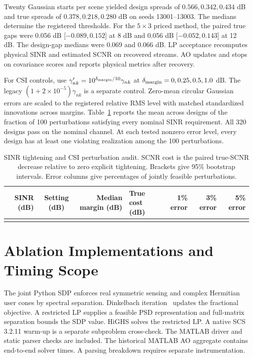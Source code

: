 \documentclass[journal]{IEEEtran}
\makeatletter
\newcommand{\TabRows}[1]{\@@input{#1}}
\providecommand{\LetterAssets}{../../results/partf-2026-11-23/assets}
\makeatother
\begin{document}
Twenty Gaussian starts per scene yielded design spreads of \(0.566,0.342,0.434\) dB and true spreads of \(0.378,0.218,0.280\) dB on seeds 13001--13003. The medians determine the registered thresholds. For the \(5\times3\) priced method, the paired true gaps were 0.056 dB [\(-0.089,0.152\)] at 8 dB and 0.056 dB [\(-0.052,0.143\)] at 12 dB. The design-gap medians were 0.069 and 0.066 dB. LP acceptance recomputes physical SINR and estimated SCNR on recovered streams. AO updates and stops on covariance scores and reports physical metrics after recovery.

For CSI controls, use \(\gamma'_{nk}=10^{\delta_{\rm margin}/10}\gamma_{nk}\) at \(\delta_{\rm margin}=0,0.25,0.5,1.0\) dB. The legacy \((1+2\times10^{-5})\gamma_{nk}\) is a separate control. Zero-mean circular Gaussian errors are scaled to the registered relative RMS level with matched standardized innovations across margins. Table~\ref{tab:csi} reports the mean across designs of the fraction of 100 perturbations satisfying every nominal SINR requirement. All 320 designs pass on the nominal channel. At each tested nonzero error level, every design has at least one violating realization among the 100 perturbations.

\begin{table}[t]
\caption{SINR tightening and CSI perturbation audit. SCNR cost is the paired true-SCNR decrease relative to zero explicit tightening. Brackets give 95\% bootstrap intervals. Error columns give percentages of jointly feasible perturbations.}
\label{tab:csi}
\centering\footnotesize
\begin{tabular}{@{}rcrlrrr@{}}
\toprule
SINR (dB) & Setting (dB) & Median margin (dB) & True cost (dB) & 1\% error & 3\% error & 5\% error\\
\midrule
\TabRows{\LetterAssets/csi.tex}
\bottomrule
\end{tabular}
\end{table}

\section{Ablation Implementations and Timing Scope}
The joint Python SDP enforces real symmetric sensing and complex Hermitian user cones by spectral separation. Dinkelbach iteration~\cite{dinkelbach} updates the fractional objective. A restricted LP supplies a feasible PSD representation and full-matrix separation bounds the SDP value. HiGHS solves the restricted LP. A native SCS 3.2.11 warm-up is a separate subproblem cross-check. The MATLAB driver and static parser checks are included. The historical MATLAB AO aggregate contains end-to-end solver times. A parsing breakdown requires separate instrumentation.
\end{document}
